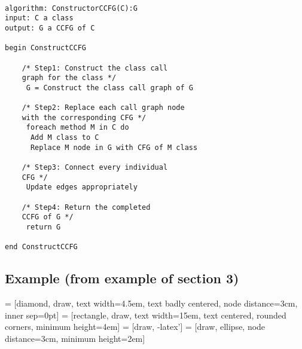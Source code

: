 \documentclass[letterpaper,twocolumn,10pt]{article}
\begin{document}
\paragraph{}
\lstset{basicstyle=\small\ttfamily, tabsize=2}
\begin{lstlisting}
algorithm: ConstructorCCFG(C):G
input: C a class
output: G a CCFG of C

begin ConstructCCFG
	
	/* Step1: Construct the class call 
	graph for the class */ 
	 G = Construct the class call graph of G
	  
	/* Step2: Replace each call graph node 
	with the corresponding CFG */
	 foreach method M in C do
	  Add M class to C	  
	  Replace M node in G with CFG of M class

	/* Step3: Connect every individual 
	CFG */
	 Update edges appropriately 

	/* Step4: Return the completed 
	CCFG of G */
	 return G

end ConstructCCFG
\end{lstlisting}

\subsection{Example (from example of section 3)}
 = [diamond, draw, 
    text width=4.5em, text badly centered, node distance=3cm, inner sep=0pt]
 = [rectangle, draw, 
    text width=15em, text centered, rounded corners, minimum height=4em]
 = [draw, -latex']
 = [draw, ellipse, node distance=3cm,
    minimum height=2em]
\begin{center}
\end{center}

{\footnotesize 

}



\theendnotes


\end{document}
